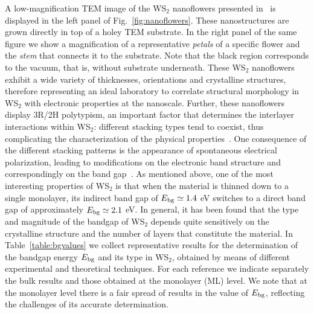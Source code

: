 A low-magnification TEM image of the WS$_2$ nanoflowers presented in~\cite{SabryaWS2} is displayed
in the left panel of Fig.~\ref{fig:nanoflowers}.
%
These nanostructures are grown directly in top of a holey TEM substrate.
%
In the right panel of the same figure we show a magnification of a
      representative {\it petals}
      of a specific flower and the {\it stem} that connects it to the substrate.
      Note that the black region corresponds to the vacuum, that is, without
      substrate underneath.
%
These WS$_2$ nanoflowers exhibit a wide variety of thicknesses, orientations
and crystalline structures, therefore representing an ideal laboratory to correlate
structural morphology in WS$_2$ with electronic properties at the nanoscale.
%
Further, these nanoflowers display 3R/2H polytypism,
an important factor that determines the interlayer
interactions within WS$_2$: different stacking types tend to coexist, 
thus complicating the characterization of the physical properties~\cite{Na:2018}.
%
One consequence of the different stacking patterns is the appearance of
spontaneous electrical polarization, leading to modifications on the 
electronic band structure and correspondingly on the band gap~\cite{Lee:2016}.
%
As mentioned above, one of the most interesting properties of  WS$_2$ is
that when the material
is thinned down to a single monolayer, its indirect band gap of
$E_{\rm bg}\simeq 1.4$ eV
switches to a direct band gap of approximately $E_{\rm bg}\simeq 2.1$ eV.
%
In general, it has been found that the type and magnitude of the bandgap
of WS$_2$ depends quite sensitively on the crystalline structure and
the number of layers that constitute the material.
%
In Table~\ref{table:bgvalues} we collect
representative results for the determination of the bandgap energy $E_{\rm bg}$
and its type in WS$_2$, obtained by means of different experimental and theoretical techniques.
%
 For each reference we indicate separately the bulk results and those
obtained at the monolayer (ML) level.
%
We note that at the monolayer level there is a fair spread of results in the
value of $E_{\rm bg}$, reflecting the challenges of its accurate determination.
 
